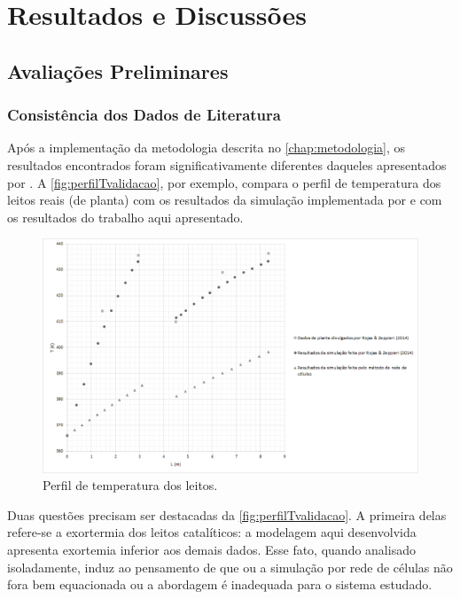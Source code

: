 %
% 
%
\chapter{Resultados e Discussões} \label{chap:resultados}

\section{Avaliações Preliminares} \label{sec:avaliacoesespreliminares}

\subsection{Consistência dos Dados de Literatura}
\label{sec:dadosliteratura}

Após a implementação da metodologia descrita no \autoref{chap:metodologia}, os
resultados encontrados foram significativamente diferentes daqueles apresentados
por . A \autoref{fig:perfilTvalidacao}, por
exemplo, compara o perfil de temperatura dos leitos reais (de planta) com os
resultados da simulação implementada por  e com os
resultados do trabalho aqui apresentado.

\begin{figure}[htb]
\centering \includegraphics[scale=0.4]{images/Chap4/perfilTvalidacao.png}
\caption{Perfil de temperatura dos leitos.}
\label{fig:perfilTvalidacao}
\end{figure}

Duas questões precisam ser destacadas da \autoref{fig:perfilTvalidacao}.
A primeira delas refere-se a exortermia dos leitos catalíticos: a modelagem aqui
desenvolvida apresenta exortemia inferior aos demais dados. Esse fato, quando
analisado isoladamente, induz ao pensamento de que ou a simulação
por rede de células não fora bem equacionada ou a abordagem é inadequada para o
sistema estudado.

